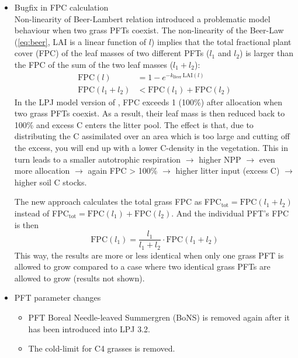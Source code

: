 \begin{itemize}
  \item \textsf{Bugfix in FPC calculation}\footnotemark[1]\\
 Non-linearity of Beer-Lambert relation introduced a problematic model behaviour when two grass PFTs coexist. The non-linearity of the Beer-Law (\ref{eq:beer}, LAI is a linear function of $l$) implies that the total fractional plant cover (FPC) of the leaf masses of two different PFTs ($l_1$ and $l_2$) is larger than the FPC of the sum of the two leaf masses ($l_1+l_2$):
\begin{align}
\mathrm{FPC}(l) &= 1 - e^{-k_{\text{Beer}}\,\text{LAI}(l)} \\
\label{eq:beer}
\mathrm{FPC}(l_1+l_2) &< \mathrm{FPC}(l_1) + \mathrm{FPC}(l_2)
\end{align}
In the LPJ model version of \citet{sitch03gcb}, FPC exceeds 1 (100\%) after allocation when two grass PFTs coexist. As a result, their leaf mass is then reduced back to 100\% and excess C enters the litter pool. The effect is that, due to distributing the C assimilated over an area which is too large and cutting off the excess, you will end up with a lower C-density in the vegetation. This in turn leads to a smaller autotrophic respiration $\rightarrow$ higher NPP $\rightarrow$ even more allocation $\rightarrow$ again FPC > 100\% $\rightarrow$ higher litter input (excess C) $\rightarrow$ higher soil C stocks.

The new approach calculates the total grass FPC as FPC$_{\text{tot}}=\text{FPC}(l_1+l_2)$ instead of FPC$_{\text{tot}}=\mathrm{FPC}(l_1) + \mathrm{FPC}(l_2)$. And the individual PFT's FPC is then
\begin{equation}
\text{FPC}(l_1) = \frac{l_1}{l_1+l_2}\cdot\text{FPC}(l_1+l_2)
\end{equation}
This way, the results are more or less identical when only one grass PFT is allowed to grow compared to a case where two identical grass PFTs are allowed to grow (results not shown).

  \item \textsf{PFT parameter changes}\footnotemark[2]
    \begin{itemize}
      \item PFT Boreal Needle-leaved Summergren (BoNS) is removed again after it has been introduced into LPJ 3.2. 
      \item The cold-limit for C4 grasses is removed. 
    \end{itemize}
\end{itemize}
\clearpage 

